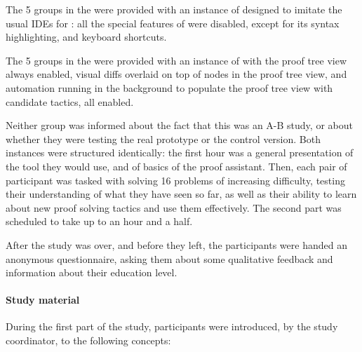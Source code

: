 The 5 groups in the  were provided with an instance of
\PeaCoq{} designed to imitate the usual IDEs for \Coq{}: all the special
features of \PeaCoq{} were disabled, except for its syntax highlighting, and
keyboard shortcuts.

The 5 groups in the  were provided with an instance of
\PeaCoq{} with the proof tree view always enabled, visual diffs overlaid on top
of nodes in the proof tree view, and automation running in the background to
populate the proof tree view with candidate tactics, all enabled.

Neither group was informed about the fact that this was an A-B study, or about
whether they were testing the real prototype or the control version.  Both
instances were structured identically: the first hour was a general presentation
of the tool they would use, and of basics of the \Coq{} proof assistant.  Then,
each pair of participant was tasked with solving 16 problems of increasing
difficulty, testing their understanding of what they have seen so far, as well
as their ability to learn about new proof solving tactics and use them
effectively.  The second part was scheduled to take up to an hour and a half.

After the study was over, and before they left, the participants were handed an
anonymous questionnaire, asking them about some qualitative feedback and
information about their education level.

\paragraph{Study material}

During the first part of the study, participants were introduced, by the study
coordinator, to the following concepts:

